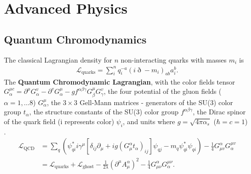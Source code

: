 \chapter{Advanced Physics}
\thispagestyle{fancy}
\section{Quantum Chromodynamics}
The classical Lagrangian density for $n$ non-interacting quarks with masses $m_i$ is 
\begin{align}
\mathcal{L}_{\textrm{quarks}}=\sum_{i}^{n}q_i^{-a}(i\eth-m_i)_{ab}a_i^b.
\end{align}
The \textbf{Quantum Chromodynamic Lagrangian}, with the color fields tensor $G_\alpha^{\mu c} = \partial^\mu G_\alpha^v-\partial^v G_\alpha^\mu-g f^{\alpha \beta \gamma}G_\beta^\mu G_\gamma^v$, the four potential of the gluon fields ($\alpha = 1,...8$) $G_\alpha^\mu$, the $3 \times 3$ Gell-Mann matrices - generators of the SU(3) color group $t_\alpha$, the structure constants of the SU(3) color group $f^{\alpha \beta \gamma}$, the Dirac spinor of the quark field (i represents color) $\psi_i$, and units where $g=\sqrt{4\pi\alpha_s}$ ($\hbar=c=1$) \cite{Nazarewicz_PHY802}.
\begin{align}
	\mathcal{L}_{\textrm{QCD}} &=\sum_{q}\left(\psi_{qi}^*i\gamma^\mu\left[\delta_{ij}\partial_\mu+ig(G_\mu^\alpha t_\alpha)_{ij}\right]\psi_{qj}-m_q\psi_{qi}^*\psi_{qi}\right)-\frac{1}{4}G^\alpha_{\mu v}G^{\mu v}_\alpha \\
	&=\mathcal{L}_{\textrm{quarks}}+\mathcal{L}_{\textrm{ghost}}-\frac{1}{2\lambda}(\partial^\mu A^\alpha_\mu)^2-\frac{1}{4}G^\alpha_{\mu\nu}G^{\mu\nu}_\alpha.
\end{align}

